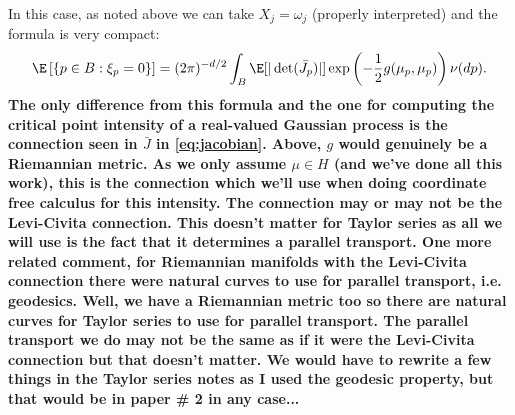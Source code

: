 \documentclass{article}
\begin{document}
In this case, as noted above we can take $X_j=\omega_j$ (properly interpreted) and the
formula is very compact:
$$
\begin{aligned}
\E \left[\{p \in B: \xi_p=0\} \right] &= (2\pi)^{-d/2} \int_{B} \E[|\det(\bar{J}_p)|]  \exp\left(-\frac{1}{2} g(\mu_{p}, \mu_{p}) \right) \nu(dp). \\
\end{aligned}
$$
{\bf 
The only difference from this formula and the one for computing
the critical point intensity of a real-valued Gaussian process is the connection seen in $\bar{J}$ in \eqref{eq:jacobian}. Above,
$g$ would genuinely be a Riemannian metric. As we only assume $\mu \in H$ (and we've done all this work), this is
the connection which we'll use when doing coordinate free calculus for this intensity. The connection
may or may not be the Levi-Civita connection. This doesn't matter for Taylor series as all we will use is the
fact that it determines a parallel transport. One more related comment, for Riemannian manifolds with
the Levi-Civita connection there were natural curves to use for parallel transport, i.e. geodesics. Well,
we have a Riemannian metric too so there are natural curves for Taylor series to use for parallel transport. The parallel transport we do may not be the same as if it were the Levi-Civita connection but that doesn't matter. We would have to rewrite a few things in the Taylor series notes as I used the geodesic property, but that would be in paper \# 2 in any case...
}
\end{document}
